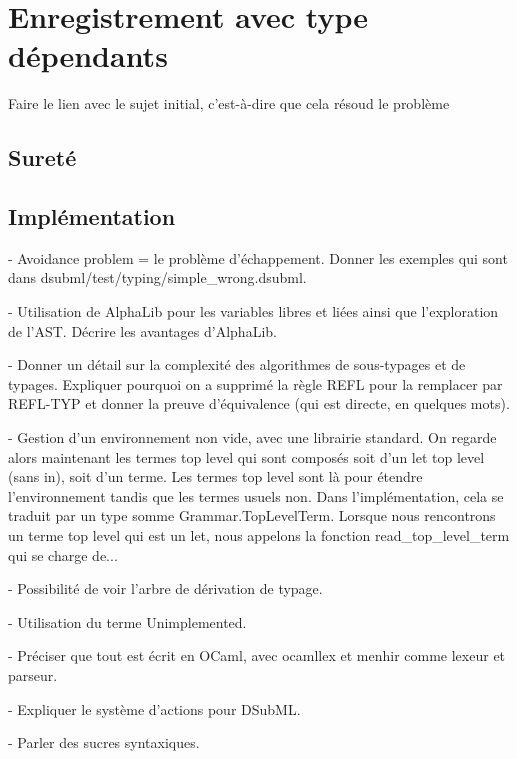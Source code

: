 \chapter{Enregistrement avec type dépendants}

Faire le lien avec le sujet initial, c'est-à-dire que cela résoud le problème 
\section{Sureté}

\section{Implémentation}

- Avoidance problem = le problème d'échappement. Donner les exemples qui sont
dans dsubml/test/typing/simple_wrong.dsubml.

- Utilisation de AlphaLib pour les variables libres et liées ainsi que
l'exploration de l'AST. Décrire les avantages d'AlphaLib.

- Donner un détail sur la complexité des algorithmes de sous-typages et de
typages. Expliquer pourquoi on a supprimé la règle REFL pour la remplacer par
REFL-TYP et donner la preuve d'équivalence (qui est directe, en quelques mots).

- Gestion d'un environnement non vide, avec une librairie standard. On regarde
alors maintenant les termes top level qui sont composés soit d'un let top level
(sans in), soit d'un terme. Les termes top level sont là pour étendre
l'environnement tandis que les termes usuels non. Dans l'implémentation, cela se
traduit par un type somme Grammar.TopLevelTerm. Lorsque nous rencontrons un
terme top level qui est un let, nous appelons la fonction read_top_level_term
qui se charge de...

- Possibilité de voir l'arbre de dérivation de typage.

- Utilisation du terme Unimplemented.

- Préciser que tout est écrit en OCaml, avec ocamllex et menhir comme lexeur et parseur.

- Expliquer le système d'actions pour DSubML.

- Parler des sucres syntaxiques.